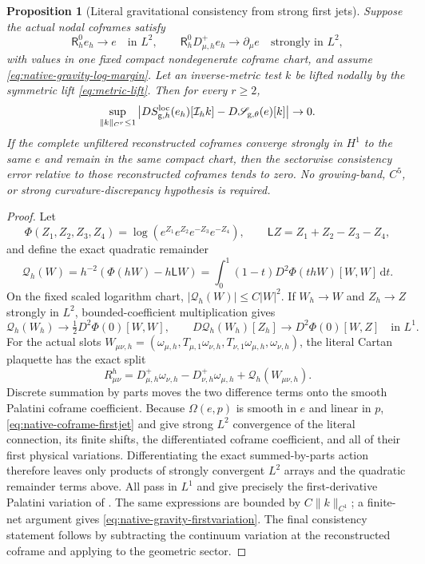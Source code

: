 \documentclass[11pt]{article}
\numberwithin{equation}{section}
\newtheorem{proposition}[proposition]{Proposition}
\theoremstyle{definition}
\theoremstyle{remark}
\newcommand{\dd}{\mathrm d}
\newcommand{\norm}[1]{\lVert#1\rVert}
\newcommand{\Sact}{\mathscr S}
\begin{document}
\begin{proposition}[Literal gravitational consistency from strong first jets]
\label{prop:native-gravity-firstjet}
Suppose the actual nodal coframes satisfy
\begin{equation}
 \mathsf R_h^0e_h\to e\quad\text{in }L^2,
 \qquad
 \mathsf R_h^0D^+_{\mu,h}e_h\to\partial_\mu e
       \quad\text{strongly in }L^2,
 \label{eq:native-coframe-firstjet}
\end{equation}
with values in one fixed compact nondegenerate coframe chart, and assume
\eqref{eq:native-gravity-log-margin}.  Let an inverse-metric test $k$ be
lifted nodally by the symmetric lift \eqref{eq:metric-lift}.  Then for every
$r\ge2$,
\begin{equation}
 \sup_{\norm{k}_{C^r}\le1}
 \left|D S_{{\rm g},h}^{\rm loc}(e_h)[\mathcal I_hk]
       -D\Sact_{{\rm g},\theta}(e)[k]\right|\to0.
 \label{eq:native-gravity-firstvariation}
\end{equation}
If the complete unfiltered reconstructed coframes converge strongly in
$H^1$ to the same $e$ and remain in the same compact chart, then the
sectorwise consistency error relative to those reconstructed coframes tends
to zero.  No growing-band, $C^5$, or strong curvature-discrepancy hypothesis
is required.
\end{proposition}
\begin{proof}
Let
\[
 \Phi(Z_1,Z_2,Z_3,Z_4)
 =\log(e^{Z_1}e^{Z_2}e^{-Z_3}e^{-Z_4}),
 \qquad \mathsf LZ=Z_1+Z_2-Z_3-Z_4,
\]
and define the exact quadratic remainder
\[
 \mathcal Q_h(W)=h^{-2}(\Phi(hW)-h\mathsf LW)
 =\int_0^1(1-t)D^2\Phi(thW)[W,W]\,\dd t.
\]
On the fixed scaled logarithm chart, $|\mathcal Q_h(W)|\le C|W|^2$.
If $W_h\to W$ and $Z_h\to Z$ strongly in $L^2$, bounded-coefficient
multiplication gives
\[
 \mathcal Q_h(W_h)\to\tfrac12D^2\Phi(0)[W,W],\qquad
 D\mathcal Q_h(W_h)[Z_h]\to D^2\Phi(0)[W,Z]
 \quad\text{in }L^1.
\]
For the actual slots
$W_{\mu\nu,h}=(\omega_{\mu,h},T_{\mu,1}\omega_{\nu,h},
T_{\nu,1}\omega_{\mu,h},\omega_{\nu,h})$, the literal Cartan plaquette has
the exact split
\[
 R^h_{\mu\nu}
 =D^+_{\mu,h}\omega_{\nu,h}-D^+_{\nu,h}\omega_{\mu,h}
   +\mathcal Q_h(W_{\mu\nu,h}).
\]
Discrete summation by parts moves the two difference terms onto the smooth
Palatini coframe coefficient.  Because $\Omega(e,p)$ is smooth in $e$ and
linear in $p$, \eqref{eq:native-coframe-firstjet} and
 give strong $L^2$ convergence of the literal connection,
its finite shifts, the differentiated coframe coefficient, and all of their
first physical variations.  Differentiating the exact summed-by-parts action
therefore leaves only products of strongly convergent $L^2$ arrays and the
quadratic remainder terms above.  All pass in $L^1$ and give precisely the
first-derivative Palatini variation of .  The same
expressions are bounded by $C\norm{k}_{C^1}$; a finite-net argument gives
\eqref{eq:native-gravity-firstvariation}.  The final consistency statement
follows by subtracting the continuum variation at the reconstructed coframe
and applying  to the geometric sector.
\end{proof}
\end{document}
